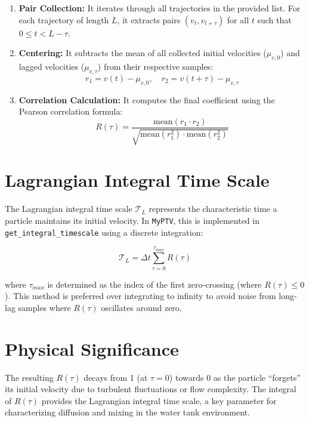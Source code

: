\documentclass[12pt]{article}
\begin{document}
\begin{enumerate}
    \item \textbf{Pair Collection:} It iterates through all trajectories in the provided list. For each trajectory of length $L$, it extracts pairs $(v_t, v_{t+\tau})$ for all $t$ such that $0 \le t < L-\tau$.
    \item \textbf{Centering:} It subtracts the mean of all collected initial velocities ($\mu_{v,0}$) and lagged velocities ($\mu_{v,\tau}$) from their respective samples:
    \begin{equation}
    r_{1} = v(t) - \mu_{v,0}, \quad r_{2} = v(t+\tau) - \mu_{v,\tau}
    \end{equation}
    \item \textbf{Correlation Calculation:} It computes the final coefficient using the Pearson correlation formula:
    \begin{equation}
    R(\tau) = \frac{\text{mean}(r_1 \cdot r_2)}{\sqrt{\text{mean}(r_1^2) \cdot \text{mean}(r_2^2)}}
    \end{equation}
\end{enumerate}

\section{Lagrangian Integral Time Scale}
The Lagrangian integral time scale $\mathcal{T}_L$ represents the characteristic time a particle maintains its initial velocity. In \texttt{MyPTV}, this is implemented in \texttt{get\_integral\_timescale} using a discrete integration:

\begin{equation}
\mathcal{T}_L = \Delta t \sum_{\tau=0}^{\tau_{max}} R(\tau)
\end{equation}

where $\tau_{max}$ is determined as the index of the first zero-crossing (where $R(\tau) \le 0$). This method is preferred over integrating to infinity to avoid noise from long-lag samples where $R(\tau)$ oscillates around zero.

\section{Physical Significance}
The resulting $R(\tau)$ decays from 1 (at $\tau=0$) towards 0 as the particle ``forgets'' its initial velocity due to turbulent fluctuations or flow complexity. The integral of $R(\tau)$ provides the Lagrangian integral time scale, a key parameter for characterizing diffusion and mixing in the water tank environment.
\end{document}
